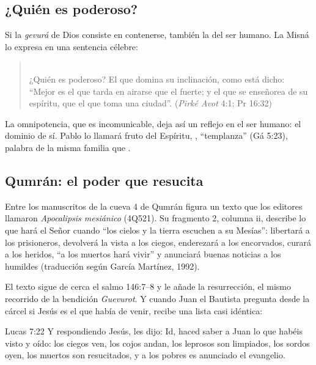 
\subsection{¿Quién es poderoso?}

Si la \emph{gevurá} de Dios consiste en contenerse, también la del ser humano. La Misná lo expresa en una sentencia célebre:

\begin{quote}\small
{}\\
¿Quién es poderoso? El que domina su inclinación, como está dicho: ``Mejor es el que tarda en airarse que el fuerte; y el que se enseñorea de su espíritu, que el que toma una ciudad''. (\emph{Pirké Avot} 4:1; Pr 16:32)
\end{quote}

La omnipotencia, que es incomunicable, deja así un reflejo en el ser humano: el dominio de sí. Pablo lo llamará fruto del Espíritu, , ``templanza'' (Gá 5:23), palabra de la misma familia que .

\subsection{Qumrán: el poder que resucita}

Entre los manuscritos de la cueva 4 de Qumrán figura un texto que los editores llamaron \emph{Apocalipsis mesiánico} (4Q521). Su fragmento 2, columna ii, describe lo que hará el Señor cuando ``los cielos y la tierra escuchen a su Mesías'': libertará a los prisioneros, devolverá la vista a los ciegos, enderezará a los encorvados, curará a los heridos, ``a los muertos hará vivir'' y anunciará buenas noticias a los humildes (traducción según García Martínez, 1992).

El texto sigue de cerca el salmo 146:7--8 y le añade la resurrección, el mismo recorrido de la bendición \emph{Guevurot}. Y cuando Juan el Bautista pregunta desde la cárcel si Jesús es el que había de venir, recibe una lista casi idéntica:

\begin{verso}{Lucas 7:22}
Y respondiendo Jesús, les dijo: Id, haced saber a Juan lo que habéis visto y oído: los ciegos ven, los cojos andan, los leprosos son limpiados, los sordos oyen, los muertos son resucitados, y a los pobres es anunciado el evangelio.
\end{verso}


